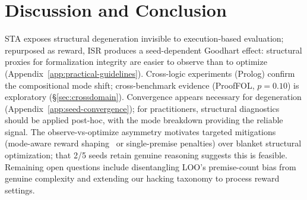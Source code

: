 \section{Discussion and Conclusion}
\label{sec:discussion}

STA exposes structural degeneration invisible to execution-based evaluation; repurposed as reward, ISR produces a seed-dependent Goodhart effect: structural proxies for formalization integrity are easier to observe than to optimize (Appendix~\ref{app:practical-guidelines}).
Cross-logic experiments (Prolog) confirm the compositional mode shift; cross-benchmark evidence (ProofFOL, $p{=}0.10$) is exploratory (\S\ref{sec:crossdomain}).
Convergence appears necessary for degeneration (Appendix~\ref{app:seed-convergence}); for practitioners, structural diagnostics should be applied post-hoc, with the mode breakdown providing the reliable signal.
The observe-vs-optimize asymmetry motivates targeted mitigations (mode-aware reward shaping~\citep{tarek2025reward, pronesti2026beyond} or single-premise penalties) over blanket structural optimization; that 2/5 seeds retain genuine reasoning suggests this is feasible.
Remaining open questions include disentangling LOO's premise-count bias from genuine complexity and extending our hacking taxonomy to process reward settings.
